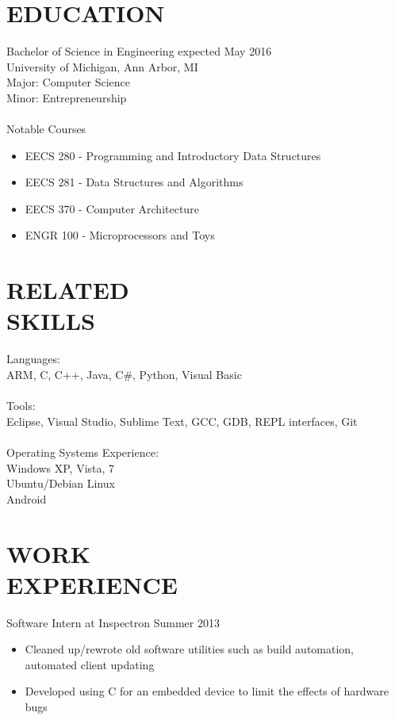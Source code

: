 \documentclass[line,margin]{res}
\begin{document}
\address{ajlj@umich.edu -- 248-622-7017}
\address{Citizen of the United States and Italy}
 
\begin{resume}
\section{EDUCATION} {\sc Bachelor of Science in Engineering} \hfill expected May 2016\\
                University of Michigan, Ann Arbor, MI \\
                Major: Computer Science \\
                Minor: Entrepreneurship \\ \\
                {\sc Notable Courses}
                \begin{itemize}
                \item EECS 280 - Programming and Introductory Data Structures
                \item EECS 281 - Data Structures and Algorithms
                \item EECS 370 - Computer Architecture
                \item ENGR 100 - Microprocessors and Toys
                \end{itemize}
 
 
\section{RELATED \\ SKILLS} 
				{\sc Languages:} \\
				ARM, C, C++, Java, C\#, Python, Visual Basic \\ \\
                {\sc Tools:} \\
                Eclipse, Visual Studio, Sublime Text, GCC, GDB, REPL interfaces, Git\\ \\
				{\sc Operating Systems Experience:}\\
				Windows XP, Vista, 7 \\
				Ubuntu/Debian Linux \\
				Android
 
\section{WORK \\ EXPERIENCE} {\sc Software Intern at Inspectron} \hfill Summer 2013 \\
                 \begin{itemize}  \itemsep -2pt %
                 \item Cleaned up/rewrote old software utilities such as build automation, automated client updating
                \item   Developed using C for an embedded device to limit the effects of hardware bugs
                \end{itemize}
 

\end{resume}
\end{document}
